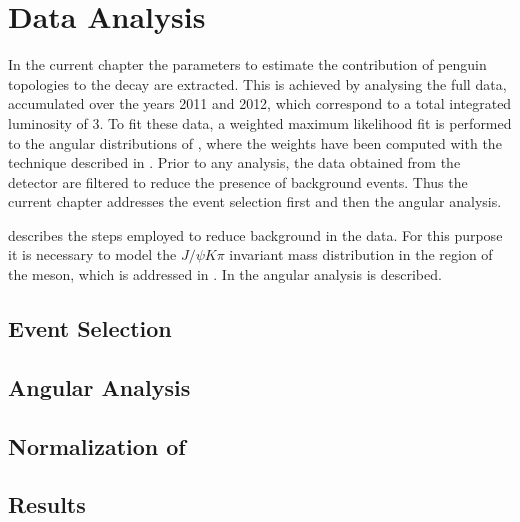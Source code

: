 \chapter{Data Analysis}
\label{Data_Analysis}

In the current chapter the parameters to estimate the contribution of penguin topologies to the \BsJpsiPhi
decay are extracted. This is achieved by analysing the full \runone \lhcb data, accumulated over the years 2011 and 2012,
which correspond to a total integrated luminosity of 3\invfb. To fit these data, a weighted maximum likelihood fit
is performed to the angular distributions of \BsJpsiKst, where the weights have been computed with the \sPlot
technique \cite{splot} described in .
Prior to any analysis, the data obtained from the detector are filtered to reduce the presence of
background events. Thus the current chapter addresses the event selection first and then the angular analysis.

 describes the steps employed to reduce background in the data. For this purpose
it is necessary to model the $J/\psi K\pi$ invariant mass distribution in the region of the \Bs meson, which
is addressed in . In  the angular analysis is described.\\

\section{Event Selection}
\label{Event_Selection}


\section{Angular Analysis}
\label{Angular_Analysis}


\section{Normalization of \BsJpsiKpi}
\label{Normalization}


\section{Results}
\label{Results}

